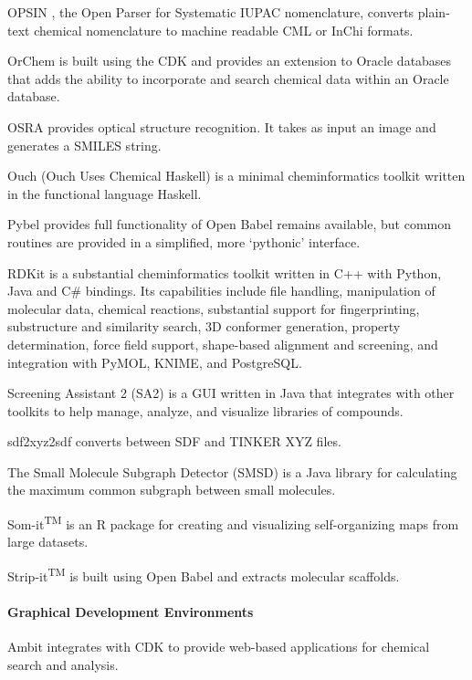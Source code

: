 OPSIN \cite{Lowe_2011}, the Open Parser for Systematic IUPAC nomenclature, converts plain-text chemical nomenclature to machine readable CML or InChi formats.

OrChem is built using the CDK and provides an extension to Oracle databases that adds the ability to incorporate and search chemical data within an Oracle database.

OSRA \cite{Filippov_2009} provides optical structure recognition. It takes as input an image and generates a SMILES string.

Ouch (Ouch Uses Chemical Haskell) is a minimal cheminformatics toolkit written in the functional language Haskell.

Pybel \cite{O_Boyle_2008} provides full functionality of Open Babel remains available, but common routines are provided in a simplified, more `pythonic' interface.

RDKit is a substantial cheminformatics toolkit written in C++ with Python, Java and C# bindings.  Its capabilities include file handling, manipulation of molecular data, chemical reactions, substantial support for fingerprinting, substructure and similarity search, 3D conformer generation, property determination, force field support, shape-based alignment and screening, and integration with PyMOL, KNIME, and PostgreSQL.

Screening Assistant 2 (SA2) \cite{Guilloux_2012} is a GUI written in Java that integrates with other toolkits to help manage, analyze, and visualize libraries of compounds.

sdf2xyz2sdf  \cite{Tosco_2011} converts between SDF and TINKER XYZ files.

The Small Molecule Subgraph Detector (SMSD) \cite{Rahman_2009} is a Java library for calculating the maximum common subgraph between small molecules.

Som-it\textsuperscript{TM}  is an R package for creating and visualizing self-organizing maps from large datasets.

Strip-it\textsuperscript{TM} is built using Open Babel and extracts molecular scaffolds. 


\paragraph{Graphical Development Environments}

Ambit \cite{Jeliazkova_2011} integrates with CDK to provide web-based applications for chemical search and analysis.


